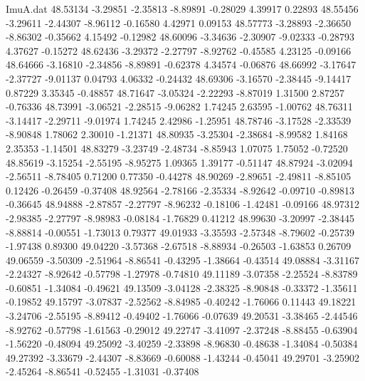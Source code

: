 \begin{filecontents}{ImuA.dat}
  48.53134   -3.29851   -2.35813   -8.89891   -0.28029    4.39917    0.22893
  48.55456   -3.29611   -2.44307   -8.96112   -0.16580    4.42971    0.09153
  48.57773   -3.28893   -2.36650   -8.86302   -0.35662    4.15492   -0.12982
  48.60096   -3.34636   -2.30907   -9.02333   -0.28793    4.37627   -0.15272
  48.62436   -3.29372   -2.27797   -8.92762   -0.45585    4.23125   -0.09166
  48.64666   -3.16810   -2.34856   -8.89891   -0.62378    4.34574   -0.06876
  48.66992   -3.17647   -2.37727   -9.01137    0.04793    4.06332   -0.24432
  48.69306   -3.16570   -2.38445   -9.14417    0.87229    3.35345   -0.48857
  48.71647   -3.05324   -2.22293   -8.87019    1.31500    2.87257   -0.76336
  48.73991   -3.06521   -2.28515   -9.06282    1.74245    2.63595   -1.00762
  48.76311   -3.14417   -2.29711   -9.01974    1.74245    2.42986   -1.25951
  48.78746   -3.17528   -2.33539   -8.90848    1.78062    2.30010   -1.21371
  48.80935   -3.25304   -2.38684   -8.99582    1.84168    2.35353   -1.14501
  48.83279   -3.23749   -2.48734   -8.85943    1.07075    1.75052   -0.72520
  48.85619   -3.15254   -2.55195   -8.95275    1.09365    1.39177   -0.51147
  48.87924   -3.02094   -2.56511   -8.78405    0.71200    0.77350   -0.44278
  48.90269   -2.89651   -2.49811   -8.85105    0.12426   -0.26459   -0.37408
  48.92564   -2.78166   -2.35334   -8.92642   -0.09710   -0.89813   -0.36645
  48.94888   -2.87857   -2.27797   -8.96232   -0.18106   -1.42481   -0.09166
  48.97312   -2.98385   -2.27797   -8.98983   -0.08184   -1.76829    0.41212
  48.99630   -3.20997   -2.38445   -8.88814   -0.00551   -1.73013    0.79377
  49.01933   -3.35593   -2.57348   -8.79602   -0.25739   -1.97438    0.89300
  49.04220   -3.57368   -2.67518   -8.88934   -0.26503   -1.63853    0.26709
  49.06559   -3.50309   -2.51964   -8.86541   -0.43295   -1.38664   -0.43514
  49.08884   -3.31167   -2.24327   -8.92642   -0.57798   -1.27978   -0.74810
  49.11189   -3.07358   -2.25524   -8.83789   -0.60851   -1.34084   -0.49621
  49.13509   -3.04128   -2.38325   -8.90848   -0.33372   -1.35611   -0.19852
  49.15797   -3.07837   -2.52562   -8.84985   -0.40242   -1.76066    0.11443
  49.18221   -3.24706   -2.55195   -8.89412   -0.49402   -1.76066   -0.07639
  49.20531   -3.38465   -2.44546   -8.92762   -0.57798   -1.61563   -0.29012
  49.22747   -3.41097   -2.37248   -8.88455   -0.63904   -1.56220   -0.48094
  49.25092   -3.40259   -2.33898   -8.96830   -0.48638   -1.34084   -0.50384
  49.27392   -3.33679   -2.44307   -8.83669   -0.60088   -1.43244   -0.45041
  49.29701   -3.25902   -2.45264   -8.86541   -0.52455   -1.31031   -0.37408

\end{filecontents}

